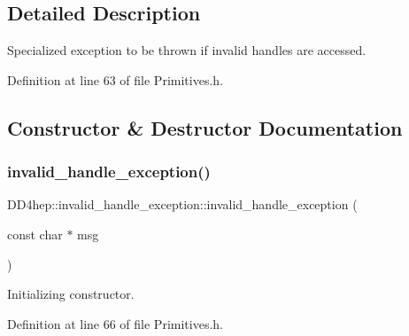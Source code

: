 \subsection{Detailed Description}
Specialized exception to be thrown if invalid handles are accessed. 

Definition at line 63 of file Primitives.\+h.



\subsection{Constructor \& Destructor Documentation}
\hypertarget{class_d_d4hep_1_1invalid__handle__exception_a89d95e32d6ca7f17d77b4f44fa7ecc7a}{}\label{class_d_d4hep_1_1invalid__handle__exception_a89d95e32d6ca7f17d77b4f44fa7ecc7a} 
\subsubsection{\texorpdfstring{invalid\+\_\+handle\+\_\+exception()}{invalid\_handle\_exception()}\hspace{0.1cm}{\footnotesize\ttfamily [1/4]}}
{\footnotesize\ttfamily D\+D4hep\+::invalid\+\_\+handle\+\_\+exception\+::invalid\+\_\+handle\+\_\+exception (\begin{DoxyParamCaption}\item[{const char $\ast$}]{msg }\end{DoxyParamCaption})\hspace{0.3cm}{\ttfamily [inline]}}



Initializing constructor. 



Definition at line 66 of file Primitives.\+h.

\hypertarget{class_d_d4hep_1_1invalid__handle__exception_a6ed4463753276b8dc70197302a5ca085}{}\label{class_d_d4hep_1_1invalid__handle__exception_a6ed4463753276b8dc70197302a5ca085} 
